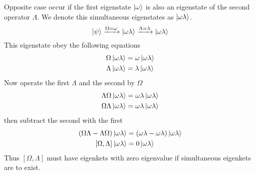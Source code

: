 \documentclass[../../../main.tex]{subfiles}
\begin{document}
Opposite case occur if the first eigenstate $\ket{\omega }$ is also an eigenstate of the second operator $\Lambda$.
We denote this simultaneous eigenstates as $\ket{\omega\lambda}$.
\begin{equation*}
    \ket{\psi}\xrightarrow{\Omega=\omega}\ket{\omega\lambda}\xrightarrow{\Lambda=\lambda}\ket{\omega\lambda}
\end{equation*}
This eigenstate obey the following equations
\begin{align*}
    \Omega \ket{\omega\lambda}&= \omega \ket{\omega\lambda}\\
    \Lambda\ket{\omega\lambda}&= \lambda \ket{\omega\lambda}
\end{align*}
Now operate the first $\Lambda$ and the second by $\Omega$
\begin{align*}
    \Lambda\Omega \ket{\omega\lambda}&= \omega\lambda \ket{\omega\lambda}\\
    \Omega\Lambda\ket{\omega\lambda}&= \omega\lambda \ket{\omega\lambda}
\end{align*}
then subtract the second with the first
\begin{align*}
    (\Omega\Lambda-\Lambda\Omega)\ket{\omega\lambda}&= (\omega\lambda-\omega\lambda)\ket{\omega\lambda}\\
    [\Omega,\Lambda]\ket{\omega\lambda}&= 0 \ket{\omega\lambda}
\end{align*}
Thus $[\Omega,\Lambda]$ must have eigenkets with zero eigenvalue if simultaneous eigenkets are to exist.
\end{document}

